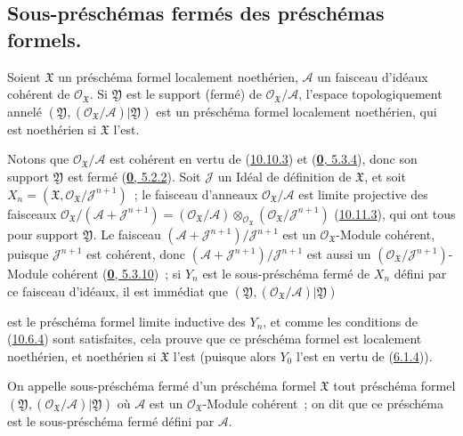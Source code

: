\subsection{Sous-préschémas fermés des préschémas formels.}
\label{subsection:I.10.14-fr}

\begin{proposition}[10.14.1]
\label{I.10.14.1-fr}
Soient $\mathfrak{X}$ un préschéma formel localement noethérien,
$\mathscr{A}$ un faisceau d'idéaux cohérent de
$\mathscr{O}_{\mathfrak{X}}$. Si $\mathfrak{Y}$ est le support (fermé) de
$\mathscr{O}_{\mathfrak{X}}/\mathscr{A}$, l'espace topologiquement annelé
$(\mathfrak{Y},(\mathscr{O}_{\mathfrak{X}}/\mathscr{A})|\mathfrak{Y})$ est
un préschéma formel localement noethérien, qui est noethérien si
$\mathfrak{X}$ l'est.
\end{proposition}

Notons que $\mathscr{O}_{\mathfrak{X}}/\mathscr{A}$ est cohérent en vertu de
(\hyperref[I.10.10.3-fr]{10.10.3}) et
(\hyperref[0.5.3.4-fr]{\textbf{0}, 5.3.4}), donc son support $\mathfrak{Y}$ est fermé
(\hyperref[0.5.2.2-fr]{\textbf{0}, 5.2.2}). Soit $\mathscr{J}$ un Idéal de définition
de $\mathfrak{X}$, et soit
$X_n=(\mathfrak{X},\mathscr{O}_{\mathfrak{X}}/\mathscr{J}^{n+1})$~; le
faisceau d'anneaux $\mathscr{O}_{\mathfrak{X}}/\mathscr{A}$ est limite
projective des faisceaux
$\mathscr{O}_{\mathfrak{X}}/(\mathscr{A}+\mathscr{J}^{n+1})
=(\mathscr{O}_{\mathfrak{X}}/\mathscr{A})
\otimes_{\mathscr{O}_{\mathfrak{X}}}
(\mathscr{O}_{\mathfrak{X}}/\mathscr{J}^{n+1})$
(\hyperref[I.10.11.3-fr]{10.11.3}), qui ont tous pour support
$\mathfrak{Y}$. Le faisceau
$(\mathscr{A}+\mathscr{J}^{n+1})/\mathscr{J}^{n+1}$ est un
$\mathscr{O}_{\mathfrak{X}}$-Module cohérent, puisque
$\mathscr{J}^{n+1}$ est cohérent, donc
$(\mathscr{A}+\mathscr{J}^{n+1})/\mathscr{J}^{n+1}$ est aussi un
$(\mathscr{O}_{\mathfrak{X}}/\mathscr{J}^{n+1})$-Module cohérent
(\hyperref[0.5.3.10-fr]{\textbf{0}, 5.3.10})~; si $Y_n$ est le sous-préschéma fermé
de $X_n$ défini par ce faisceau d'idéaux, il est immédiat que
$(\mathfrak{Y},(\mathscr{O}_{\mathfrak{X}}/\mathscr{A})|\mathfrak{Y})$

est le préschéma formel limite inductive des $Y_n$, et comme les conditions de
(\hyperref[I.10.6.4-fr]{10.6.4}) sont satisfaites, cela prouve que ce préschéma
formel est localement noethérien, et noethérien si $\mathfrak{X}$ l'est (puisque
alors $Y_0$ l'est en vertu de (\hyperref[I.6.1.4-fr]{6.1.4})).

\begin{definition}[10.14.2]
\label{I.10.14.2-fr}
On appelle sous-préschéma fermé d'un préschéma formel $\mathfrak{X}$ tout
préschéma formel
$(\mathfrak{Y},(\mathscr{O}_{\mathfrak{X}}/\mathscr{A})|\mathfrak{Y})$ où
$\mathscr{A}$ est un $\mathscr{O}_{\mathfrak{X}}$-Module cohérent~; on dit que ce
préschéma est le sous-préschéma fermé défini par $\mathscr{A}$.
\end{definition}

